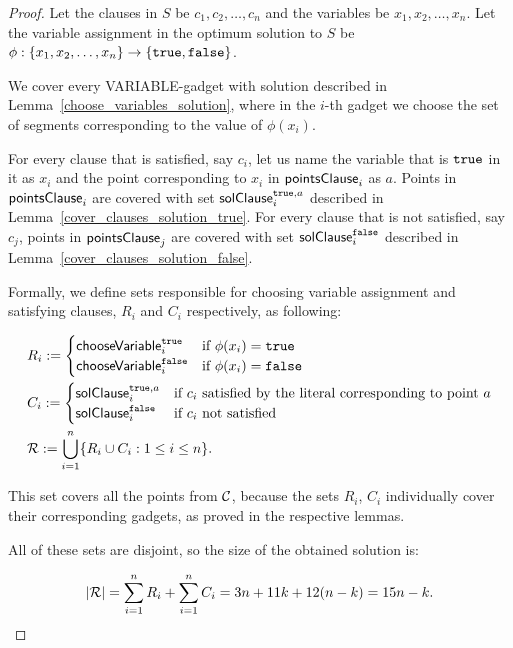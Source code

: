 \begin{proof}
Let the clauses in $S$ be $c_1,c_2,\ldots,c_n$
and the variables be $x_1,x_2,\ldots,x_n$.
Let the variable assignment in
the optimum solution to $S$ be
$\phi : \{ x_1, x_2, \ldots, x_n\} \rightarrow \{\texttt{true}, \texttt{false}\}$.


We cover every VARIABLE-gadget with solution described in
Lemma~\ref{choose_variables_solution}, where
in the $i$-th gadget we choose the set of segments corresponding to the
value of $\phi(x_i)$.

For every clause that is satisfied, say $c_i$, 
let us name the variable that is $\texttt{true}$ in it as $x_i$
and the point corresponding to $x_i$ in $\mathsf{pointsClause}_{i}$ as $a$.
Points in $\mathsf{pointsClause}_{i}$ 
are covered with set $\mathsf{solClause}^{\texttt{true},a}_i$ described in
Lemma~\ref{cover_clauses_solution_true}.
For every clause that is not satisfied, say $c_j$,
points in $\mathsf{pointsClause}_{j}$ are covered
with set $\mathsf{solClause}^{\texttt{false}}_i$ described in
Lemma~\ref{cover_clauses_solution_false}.

Formally, we define 
sets responsible for choosing variable assignment and satisfying clauses,
$R_i$ and $C_i$ respectively, as following:

\begin{align}
	\begin{split}
	& R_i := \begin{cases}
		\mathsf{chooseVariable}^{\texttt{true}}_{i} & \text{if}\ \phi(x_i) = \texttt{true} \\
		\mathsf{chooseVariable}^{\texttt{false}}_{i} & \text{if}\ \phi(x_i) = \texttt{false} \\
		\end{cases} \\
	& C_i := \begin{cases}
		\mathsf{solClause}^{\texttt{true},a}_i & \text{if}\ c_i \text{ satisfied by the literal corresponding to point } a \\
		\mathsf{solClause}^{\texttt{false}}_i & \text{if}\ c_i \text{ not satisfied}
		\end{cases} \\
	& \mathcal{R} := \bigcup\limits_{i=1}^{n} \{R_i \cup C_i : 1 \le i \le n\}.
    \end{split}
\end{align}


This set covers all the points from $\mathcal{C}$, because
the sets $R_i$, $C_i$ individually cover their corresponding gadgets,
as proved in the respective lemmas.

All of these sets are disjoint, so the size of the obtained solution is:

$$|\mathcal{R}| = \sum_{i=1}^{n} R_i + \sum_{i=1}^n C_i = 3n + 11k + 12(n-k) = 15n - k.\qedhere$$
\end{proof}


